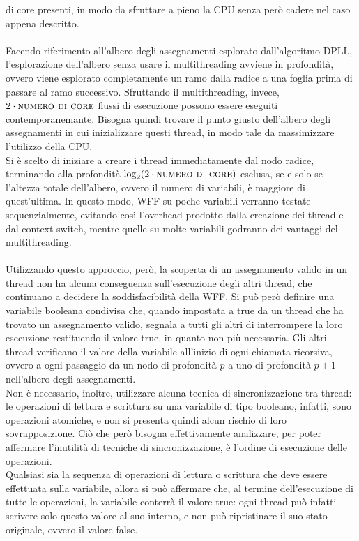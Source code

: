 di core presenti, in modo da sfruttare a pieno la CPU senza però cadere nel caso appena descritto.\\
\\
Facendo riferimento all'albero degli assegnamenti esplorato dall'algoritmo DPLL, l'esplorazione dell'albero senza usare il multithreading 
avviene in profondità, ovvero viene esplorato completamente un ramo dalla radice a una foglia prima di
passare al ramo successivo. Sfruttando il multithreading, invece, $2 \cdot \textsc{numero di core}$
flussi di esecuzione possono essere eseguiti contemporanemante.
Bisogna quindi trovare il punto giusto dell'albero degli assegnamenti in cui inizializzare questi thread, 
in modo tale da massimizzare l'utilizzo della CPU.\\
Si è scelto di iniziare a creare i thread immediatamente dal nodo radice, terminando alla profondità
$\log_2 (2 \cdot \textsc{numero di core})$ esclusa, se e solo se l'altezza totale dell'albero, ovvero il numero 
di variabili, è maggiore di quest'ultima.
In questo modo, WFF su poche variabili verranno testate sequenzialmente, evitando così l'overhead prodotto dalla creazione
dei thread e dal context switch, mentre quelle su molte variabili godranno dei vantaggi del multithreading.\\
\\
Utilizzando questo approccio, però, la scoperta di un assegnamento valido in un thread non ha alcuna
conseguenza sull'esecuzione degli altri thread, che continuano a decidere la soddisfacibilità della WFF.
Si può però definire una variabile booleana condivisa che, quando impostata a true
da un thread che ha trovato un assegnamento valido, segnala a tutti gli altri di interrompere
la loro esecuzione restituendo il valore true, in quanto non più necessaria.
Gli altri thread verificano il valore della variabile all'inizio di ogni chiamata ricorsiva, ovvero
a ogni passaggio da un nodo di profondità $p$ a uno di profondità $p+1$ nell'albero degli assegnamenti.\\
Non è necessario, inoltre, utilizzare alcuna tecnica di sincronizzazione tra thread: le operazioni di lettura e scrittura su una variabile di tipo booleano, infatti, sono operazioni atomiche, e
non si presenta quindi alcun rischio di loro sovrapposizione. Ciò che però bisogna effettivamente analizzare, per poter affermare l'inutilità di tecniche di sincronizzazione, è l'ordine di esecuzione delle operazioni. \\
Qualsiasi sia la sequenza di operazioni di lettura o scrittura che deve essere effettuata sulla variabile, allora si può affermare che, al termine dell'esecuzione di tutte le operazioni, la variabile conterrà il valore true: ogni thread può infatti scrivere solo questo valore al suo interno, e non può ripristinare il suo stato originale, ovvero il valore false.
